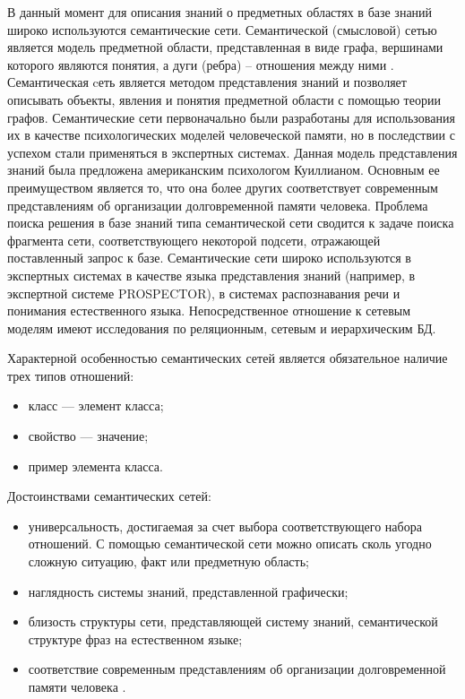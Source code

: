 В данный момент для описания знаний о предметных областях в базе знаний широко используются семантические сети. Семантической (смысловой) сетью является модель предметной области, представленная в виде графа, вершинами которого являются понятия, а дуги (ребра) – отношения между ними \cite{steyvers2005large}. Семантическая cеть является методом представления знаний и позволяет описывать объекты, явления и понятия предметной области с помощью теории графов. Семантические сети первоначально были разработаны для использования их в качестве психологических моделей человеческой памяти, но в последствии с успехом стали применяться в экспертных системах. Данная модель представления знаний была предложена американским психологом Куиллианом. Основным ее преимуществом является то, что она более других соответствует современным представлениям об организации долговременной памяти человека. Проблема поиска решения в базе знаний типа семантической сети сводится к задаче поиска фрагмента сети, соответствующего некоторой подсети, отражающей поставленный запрос к базе. Семантические сети широко используются в экспертных системах в качестве языка представления знаний (например, в экспертной системе PROSPECTOR), в системах распознавания речи и понимания естественного языка. Непосредственное отношение к сетевым моделям имеют исследования по реляционным, сетевым и иерархическим БД.

Характерной особенностью семантических сетей является обязательное наличие трех типов отношений:

\begin{itemize}
\item класс — элемент класса;
\item свойство — значение; 
\item пример элемента класса.
\end{itemize}

Достоинствами семантических сетей:

\begin{itemize}
\item универсальность, достигаемая за счет выбора соответствующего набора отношений. С помощью семантической сети можно описать сколь угодно сложную ситуацию, факт или предметную область;
\item наглядность системы знаний, представленной графически;
\item близость структуры сети, представляющей систему знаний, семантической структуре фраз на естественном языке;
\item соответствие современным представлениям об организации долговременной памяти человека \cite{gav2001sys}.
\end{itemize}

